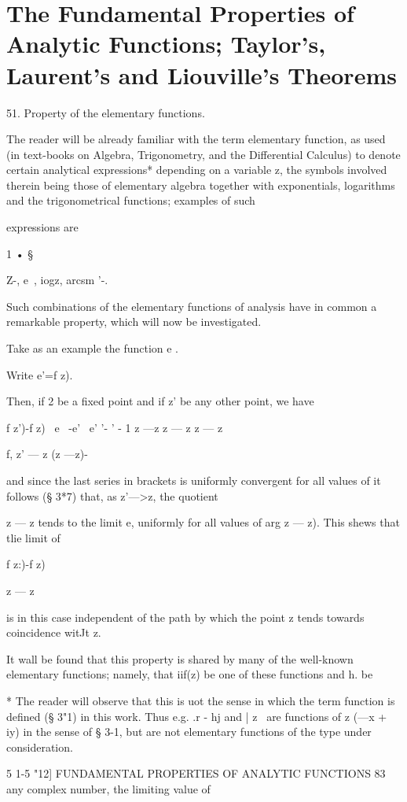 \chapter{The Fundamental Properties of Analytic Functions; 
Taylor's, Laurent's and Liouville's Theorems} 

51. Property of the elementary functions.

The reader will be already familiar with the term elementary function,
as used (in text-books on Algebra, Trigonometry, and the Differential
Calculus) to denote certain analytical expressions* depending on a
variable z, the symbols involved therein being those of elementary
algebra together with exponentials, logarithms and the trigonometrical
functions; examples of such

expressions are

1 • §

Z-, e~, iogz, arcsm '-.

Such combinations of the elementary functions of analysis have in
common a remarkable property, which will now be investigated.

Take as an example the function e .

Write e'=f z).

Then, if 2 be a fixed point and if z' be any other point, we have

f z')-f z) \ e~ -e' \, e' '- ' - 1 z —z z — z z — z

f, z' — z (z —z)-

and since the last series in brackets is uniformly convergent for all
values of it follows (§ 3*7) that, as z'—>z, the quotient

z — z tends to the limit e, uniformly for all values of arg z — z).
This shews that tlie limit of

f z:)-f z)

z — z

is in this case independent of the path by which the point z tends
towards coincidence witJt z.

It wall be found that this property is shared by many of the
well-known elementary functions; namely, that iif(z) be one of these
functions and h. be

* The reader will observe that this is uot the sense in which the term
function is defined (§ 3"1) in this work. Thus e.g. .r - hj and | z \
are functions of z (—x + iy) in the sense of § 3-1, but are not
elementary functions of the type under consideration.

5 1-5 "12] FUNDAMENTAL PROPERTIES OF ANALYTIC FUNCTIONS 83 any complex
number, the limiting value of

